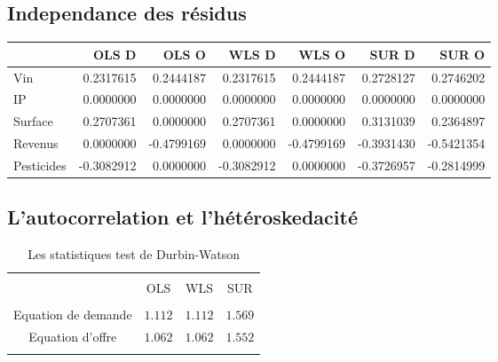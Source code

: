 \documentclass[11pt,]{article}
\begin{document}
\FloatBarrier

\hypertarget{independance-des-residus}{%
\subsection{Independance des résidus}\label{independance-des-residus}}

\FloatBarrier

\begin{longtable}[]{@{}lrrrrrr@{}}
\toprule
& OLS D & OLS O & WLS D & WLS O & SUR D & SUR O\tabularnewline
\midrule
\endhead
Vin & 0.2317615 & 0.2444187 & 0.2317615 & 0.2444187 & 0.2728127 &
0.2746202\tabularnewline
IP & 0.0000000 & 0.0000000 & 0.0000000 & 0.0000000 & 0.0000000 &
0.0000000\tabularnewline
Surface & 0.2707361 & 0.0000000 & 0.2707361 & 0.0000000 & 0.3131039 &
0.2364897\tabularnewline
Revenus & 0.0000000 & -0.4799169 & 0.0000000 & -0.4799169 & -0.3931430 &
-0.5421354\tabularnewline
Pesticides & -0.3082912 & 0.0000000 & -0.3082912 & 0.0000000 &
-0.3726957 & -0.2814999\tabularnewline
\bottomrule
\end{longtable}

\FloatBarrier

\hypertarget{lautocorrelation-et-lheteroskedacite}{%
\subsection{L'autocorrelation et
l'hétéroskedacité}\label{lautocorrelation-et-lheteroskedacite}}

\FloatBarrier

\begin{table}[!htbp] \centering 
  \caption{Les statistiques test de Durbin-Watson} 
  \label{} 
\begin{tabular}{@{\extracolsep{5pt}} cccc} 
\\[-1.8ex]\hline 
\hline \\[-1.8ex] 
 & OLS & WLS & SUR \\ 
\hline \\[-1.8ex] 
Equation de demande & $1.112$ & $1.112$ & $1.569$ \\ 
Equation d'offre & $1.062$ & $1.062$ & $1.552$ \\ 
\hline \\[-1.8ex] 
\end{tabular} 
\end{table}

\FloatBarrier

\FloatBarrier

\FloatBarrier
\end{document}
